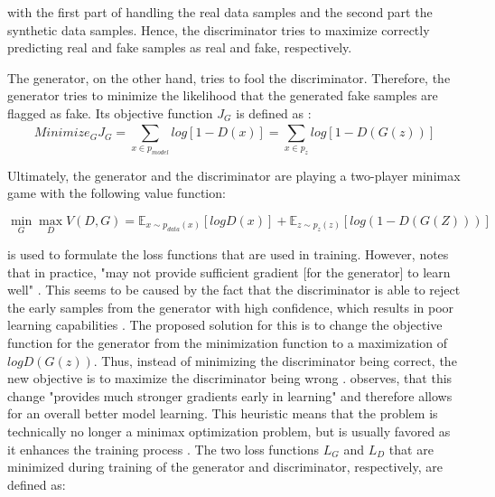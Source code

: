 with the first part of  handling the real data samples and the second part the synthetic data samples.
Hence, the discriminator tries to maximize correctly predicting real and fake samples as real and fake, respectively.

The generator, on the other hand, tries to fool the discriminator.
Therefore, the generator tries to minimize the likelihood that the generated fake samples are flagged as fake.
Its objective function $J_G$ is defined as \cite{aggarwal2018NeuralNetworksDeep}:
\begin{equation}
    \label{eqn:generator}
    Minimize_GJ_G= \sum_{x\in p_{model}}^{} log [1-D(x)] = \sum_{x\in p_z}^{} log [1-D(G(z))]
\end{equation}

\newpage %
Ultimately, the generator and the discriminator are playing a two-player minimax game with the following value function:

\begin{equation}
    \label{eqn:minimax}
    \min_G\max_DV(D,G)=\mathbb{E}_{x\sim p_{data}(x)} [log D(x)] + \mathbb{E}_{z\sim p_z(z)}[log( 1-D(G(Z)))]
\end{equation}

 is used to formulate the loss functions that are used in training.
However, \cite{NIPS2014_5ca3e9b1} notes that in practice,  "may not provide sufficient gradient [for the generator] to learn well" \cite[p. 3]{NIPS2014_5ca3e9b1}.
This seems to be caused by the fact that the discriminator is able to reject the early samples from the generator with high confidence, which results in poor learning capabilities \cite{NIPS2014_5ca3e9b1}.
The proposed solution for this is to change the objective function for the generator from the minimization function  to a maximization of $logD(G(z))$.
Thus, instead of minimizing the discriminator being correct, the new objective is to maximize the discriminator being wrong \cite{NIPS2014_5ca3e9b1}. 
\textcite[p. 3]{NIPS2014_5ca3e9b1} observes, that this change "provides much stronger gradients early in learning" and therefore allows for an overall better \gls{model} learning.
This heuristic means that the problem is technically no longer a minimax optimization problem, but is usually favored as it enhances the training process \cite[p. 442]{aggarwal2018NeuralNetworksDeep}.
The two loss functions $L_G$ and $L_D$ that are minimized during training of the generator and discriminator, respectively, are defined as:

